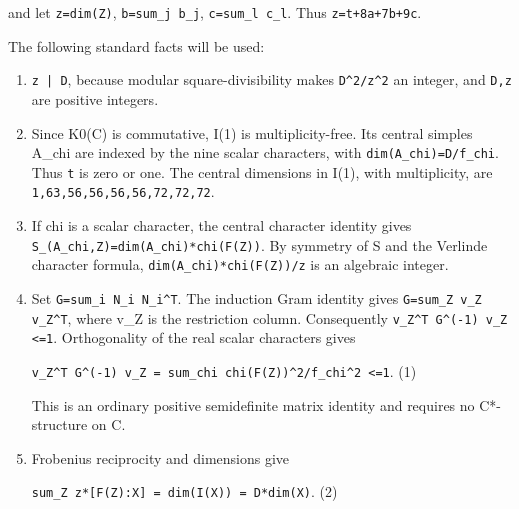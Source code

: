 and let \texttt{z=dim(\allowbreak{}Z)},
\texttt{b=sum\_\allowbreak{}j b\_\allowbreak{}j},
\texttt{c=sum\_\allowbreak{}l c\_\allowbreak{}l}. Thus
\texttt{z=t+8a\allowbreak{}+7b+9c\allowbreak{}}.

The following standard facts will be used:

\begin{enumerate}
\def\labelenumi{\arabic{enumi}.}
\item
  \texttt{z | D}, because modular square-divisibility makes
  \texttt{D\textasciicircum{}2/\allowbreak{}z\textasciicircum{}2} an
  integer, and \texttt{D,z} are positive integers.
\item
  Since K0(C) is commutative, I(1) is multiplicity-free. Its central
  simples A\_chi are indexed by the nine scalar characters, with
  \texttt{dim(A\_\allowbreak{}chi)=D\allowbreak{}/\allowbreak{}f\_\allowbreak{}chi}.
  Thus \texttt{t} is zero or one. The central dimensions in I(1), with
  multiplicity, are
  \texttt{1,63,5\allowbreak{}6,56,5\allowbreak{}6,56,7\allowbreak{}2,72,7\allowbreak{}2}.
\item
  If chi is a scalar character, the central character identity gives
  \texttt{S\_\allowbreak{}(A\_\allowbreak{}chi,Z)\allowbreak{}=dim(A\allowbreak{}\_\allowbreak{}chi)*c\allowbreak{}hi(F(Z\allowbreak{}))}.
  By symmetry of S and the Verlinde character formula,
  \texttt{dim(A\_\allowbreak{}chi)*c\allowbreak{}hi(F(Z\allowbreak{}))/\allowbreak{}z}
  is an algebraic integer.
\item
  Set
  \texttt{G=sum\_\allowbreak{}i N\_\allowbreak{}i N\_\allowbreak{}i\textasciicircum{}T}.
  The induction Gram identity gives
  \texttt{G=sum\_\allowbreak{}Z v\_\allowbreak{}Z v\_\allowbreak{}Z\textasciicircum{}T},
  where v\_Z is the restriction column. Consequently
  \texttt{v\_\allowbreak{}Z\textasciicircum{}T G\textasciicircum{}\allowbreak{}(-\allowbreak{}1) v\_\allowbreak{}Z <=1}.
  Orthogonality of the real scalar characters gives

  \texttt{v\_\allowbreak{}Z\textasciicircum{}T G\textasciicircum{}\allowbreak{}(-\allowbreak{}1) v\_\allowbreak{}Z = su\allowbreak{}m\_\allowbreak{}chi ch\allowbreak{}i(F(Z)\allowbreak{})\textasciicircum{}2/\allowbreak{}f\_\allowbreak{}chi\textasciicircum{}2 \allowbreak{}<=1}.
  (1)

  This is an ordinary positive semidefinite matrix identity and requires
  no C*-structure on C.
\item
  Frobenius reciprocity and dimensions give

  \texttt{sum\_\allowbreak{}Z z*[F\allowbreak{}(Z):X]\allowbreak{} = dim\allowbreak{}(I(X))\allowbreak{} = D*d\allowbreak{}im(X)}.
  (2)
\end{enumerate}

